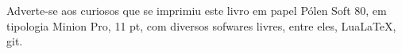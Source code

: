 \pagebreak


\ifodd\thepage\blankpage\fi

\mbox{}\vfill
\thispagestyle{empty}

\begin{center}
		\begin{minipage}{.7\textwidth}\tiny\noindent{}
		\centering\tiny
		Adverte-se aos curiosos que se imprimiu este livro em papel Pólen Soft 80, em tipologia 
		Minion Pro, 11 pt, 
		com diversos sofwares livres, 
		entre eles, Lua\LaTeX, git.\\ 
		\medskip\\\
		\end{minipage}
\end{center}